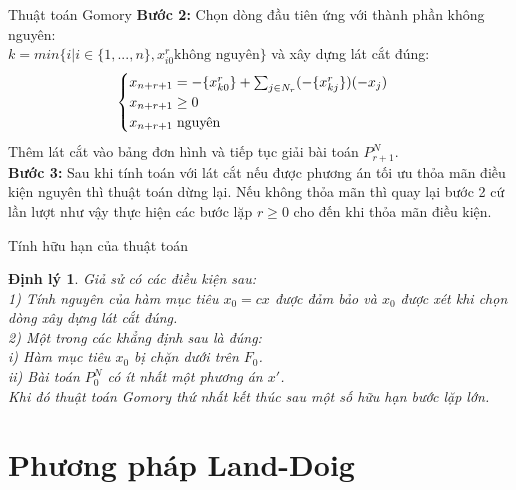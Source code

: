 \documentclass[10pt]{beamer}
\newtheorem{dl}{Định lý}[section]
\begin{document}
    \begin{frame}{Thuật toán Gomory}
     \textbf{Bước 2:}
Chọn dòng đầu tiên ứng với thành phần không nguyên:\\
$k=min\{i|i\in \{1,...,n\},x_{i0}^r \text{không nguyên}\}$ và xây dựng lát cắt đúng:\\
$$   \begin{cases}\label{latcat}
    x_{n+r+1}= -\{x_{k0}^r\} + \sum_{j\in N_r}(-\{x_{kj}^r\} )(-x_j)\\
    x_{n+r+1} \ge 0\\
    x_{n+r+1} \hspace{0.1cm} \text{nguyên}
\end{cases}$$
Thêm lát cắt vào bảng đơn hình và tiếp tục giải bài toán $P^N_{r+1}$.\\
        \textbf{Bước 3:}
Sau khi tính toán với lát cắt nếu được phương án tối ưu thỏa mãn điều kiện nguyên thì thuật toán dừng lại. Nếu không thỏa mãn thì quay lại bước 2 cứ lần lượt như vậy thực hiện các bước lặp $r \ge 0$ cho đến khi thỏa mãn điều kiện.\\

    \end{frame}

     \begin{frame}{Tính hữu hạn của thuật toán}
         \begin{dl}
Giả sử có các điều kiện sau:\\
1) Tính nguyên của hàm mục tiêu $x_0= cx$ được đảm bảo và $x_0$ được xét khi chọn dòng xây dựng lát cắt đúng.\\
2) Một trong các khẳng định sau là đúng:\\
i) Hàm mục tiêu $x_0$ bị chặn dưới trên $F_0$.\\ 
ii) Bài toán $P^N_0$ có ít nhất một phương án $x'$.\\
 Khi đó thuật toán Gomory thứ nhất kết thúc sau một số hữu hạn bước lặp lớn.
 \end{dl}
     \end{frame}
























\section{Phương pháp Land-Doig}
\end{document}
